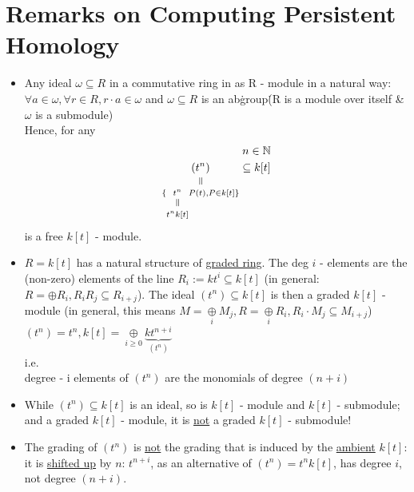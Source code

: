 \documentclass[11pt,a4paper]{report}
\newcommand{\verteq}{\rotatebox{90}{$\,=$}}
\newcommand{\equalto}[2]{\underset{\scriptstyle\overset{\mkern4mu\verteq}{#2}}{#1}}
\begin{document}
              \section*{Remarks on Computing Persistent Homology}
              
              \begin{itemize}
               \item 

              
              Any ideal $\omega \subseteq R$ in a commutative ring in as R - module in a natural way: $\forall a \in \omega, \forall r \in R, r\cdot a \in \omega$ and $\omega \subseteq R$ is an ab\. group\. (R is a module over itself \& $\omega$ is a submodule)\\
              Hence, for any
              \begin{align*}
                n \in \mathbb{N}\\
                \equalto{(t^n)}{\{\equalto{t^n}{t^nk[t]} P(t), P \in k[t]\}} \subseteq k[t]
              \end{align*}
              is a free $k[t]$ - module.\\
              \item 
              $R = k[t]$ has a natural structure of \underline{graded ring}. The deg $i$ - elements are the (non-zero) elements of the line $R_i := kt^i \subseteq k[t]$ (in general: $R = \oplus R_i, R_iR_j \subseteq R_{i+j}$).
              The ideal $(t^n) \subseteq k[t]$ is then a graded $k[t]$ - module (in general, this means $M = \underset{i}{\oplus} M_j, R = \underset{i}{\oplus} R_i, R_i \cdot M_j \subseteq M_{i+j}$) $(t^n) = t^n, k[t] = \underset{i \ge 0}{\oplus} \underbrace{kt^{n+i}}_{(t^{n})}$\\
              i.e.\\
              degree - i elements of $(t^n)$ are the monomials of degree $(n+i)$\\
              \item 
              While $(t^n) \subseteq k[t]$ is an ideal, so is $k[t]$ - module and $k[t]$ - submodule; and a graded $k[t]$ - module, it is \underline{not} a graded $k[t]$ - submodule!\\
              \item
              The grading of $(t^n)$ is \underline{not} the grading that is induced by the \underline{ambient} $k[t]$: it is \underline{shifted up} by $n$: $t^{n+i}$, as an alternative of $(t^n) = t^nk[t]$, has degree $i$, not degree $(n+i)$.\\

\end{itemize}
\end{document}
